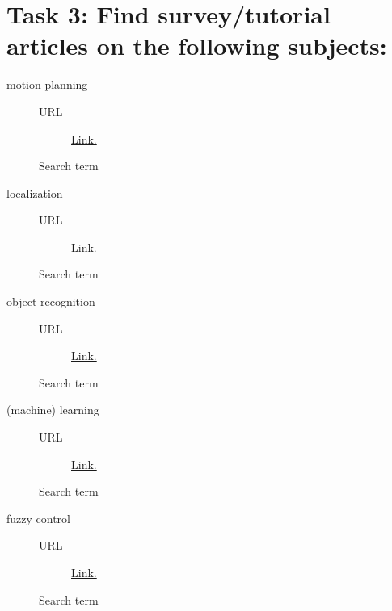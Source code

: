 \documentclass{article}
\begin{document}
\section*{Task 3: Find survey/tutorial articles on the following subjects:}
\begin{description}
    \item[motion planning] \hfill
    \begin{description}
        \item[URL] \href{}{Link.}
        \item[Search term]
    \end{description}  
    \item[localization] \hfill
    \begin{description}
        \item[URL] \href{}{Link.}
        \item[Search term]
    \end{description}  
    \item[object recognition] \hfill
    \begin{description}
        \item[URL] \href{}{Link.}
        \item[Search term]
    \end{description}  
    \item[(machine) learning] \hfill
    \begin{description}
        \item[URL] \href{}{Link.}
        \item[Search term]
    \end{description}  
    \item[fuzzy control] \hfill
    \begin{description}
        \item[URL] \href{}{Link.}
        \item[Search term]
    \end{description} 
\end{description}















%  
% 
\end{document}
